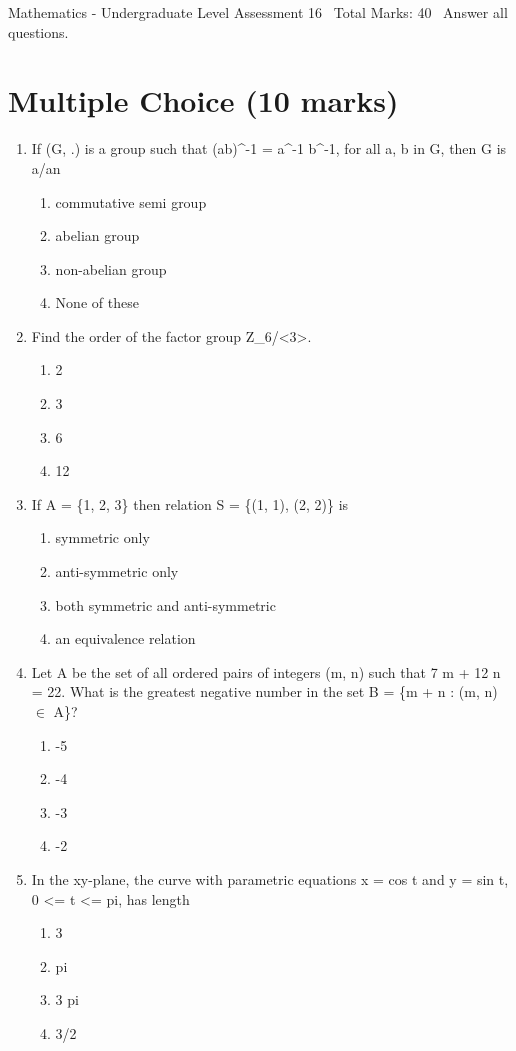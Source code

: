 \documentclass[12pt]{article}
\begin{document}
\begin{center}
Mathematics - Undergraduate Level Assessment 16 \
Total Marks: 40 \
Answer all questions.
\end{center}

\section*{Multiple Choice (10 marks)}
\begin{enumerate}[label=\arabic*.]
\item If (G, .) is a group such that (ab)^-1 = a^-1 b^-1, for all a, b in G, then G is a/an
\begin{enumerate}[label=(\alph*)]
    \item commutative semi group
    \item abelian group
    \item non-abelian group
    \item None of these
\end{enumerate}
\item Find the order of the factor group Z\_6/\textless{}3\textgreater{}.
\begin{enumerate}[label=(\alph*)]
    \item 2
    \item 3
    \item 6
    \item 12
\end{enumerate}
\item If A = \{1, 2, 3\} then relation S = \{(1, 1), (2, 2)\} is
\begin{enumerate}[label=(\alph*)]
    \item symmetric only
    \item anti-symmetric only
    \item both symmetric and anti-symmetric
    \item an equivalence relation
\end{enumerate}
\item Let A be the set of all ordered pairs of integers (m, n) such that 7 m + 12 n = 22. What is the greatest negative number in the set B = \{m + n : (m, n) \ensuremath{\in} A\}?
\begin{enumerate}[label=(\alph*)]
    \item -5
    \item -4
    \item -3
    \item -2
\end{enumerate}
\item In the xy-plane, the curve with parametric equations x = cos t and y = sin t, 0 \textless{}= t \textless{}= pi, has length
\begin{enumerate}[label=(\alph*)]
    \item 3
    \item pi
    \item 3 pi
    \item 3/2
\end{enumerate}
\end{enumerate}
\end{document}
